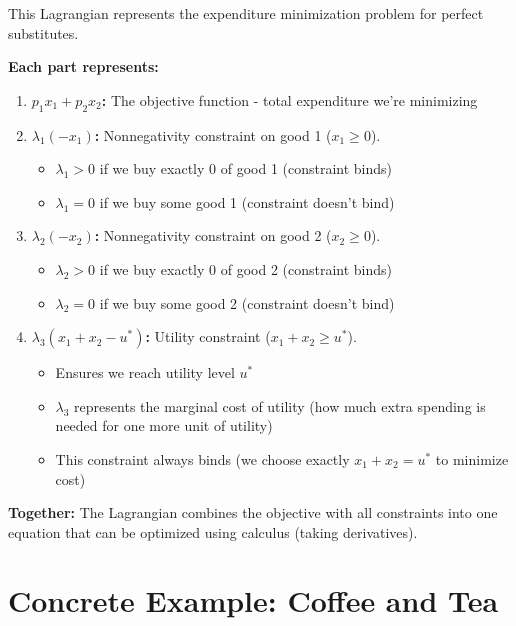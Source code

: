 \documentclass[11pt]{article}
\begin{document}
\begin{tcolorbox}[colback=green!5!white,colframe=green!75!black,title=Answer to Problem 2a]
This Lagrangian represents the expenditure minimization problem for perfect substitutes.

\textbf{Each part represents:}

\begin{enumerate}
\item \textbf{$p_1 x_1 + p_2 x_2$:} The objective function - total expenditure we're minimizing

\item \textbf{$\lambda_1(-x_1)$:} Nonnegativity constraint on good 1 ($x_1 \geq 0$).
\begin{itemize}
\item $\lambda_1 > 0$ if we buy exactly 0 of good 1 (constraint binds)
\item $\lambda_1 = 0$ if we buy some good 1 (constraint doesn't bind)
\end{itemize}

\item \textbf{$\lambda_2(-x_2)$:} Nonnegativity constraint on good 2 ($x_2 \geq 0$).
\begin{itemize}
\item $\lambda_2 > 0$ if we buy exactly 0 of good 2 (constraint binds)
\item $\lambda_2 = 0$ if we buy some good 2 (constraint doesn't bind)
\end{itemize}

\item \textbf{$\lambda_3(x_1 + x_2 - u^*)$:} Utility constraint ($x_1 + x_2 \geq u^*$).
\begin{itemize}
\item Ensures we reach utility level $u^*$
\item $\lambda_3$ represents the marginal cost of utility (how much extra spending is needed for one more unit of utility)
\item This constraint always binds (we choose exactly $x_1 + x_2 = u^*$ to minimize cost)
\end{itemize}
\end{enumerate}

\textbf{Together:} The Lagrangian combines the objective with all constraints into one equation that can be optimized using calculus (taking derivatives).
\end{tcolorbox}

\section{Concrete Example: Coffee and Tea}
\end{document}
